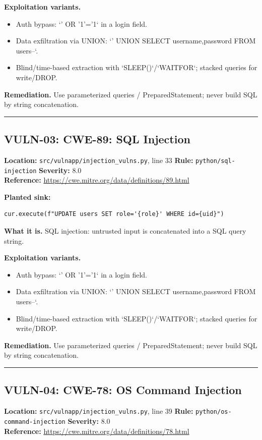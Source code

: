 \documentclass[11pt,a4paper]{article}
\begin{document}
\noindent\textbf{Exploitation variants.}
\begin{itemize}[leftmargin=1.4em,itemsep=1pt,topsep=2pt]
\item Auth bypass: `' OR '1'='1` in a login field.
\item Data exfiltration via UNION: `' UNION SELECT username,password FROM users--`.
\item Blind/time-based extraction with `SLEEP()`/`WAITFOR`; stacked queries for write/DROP.
\end{itemize}
\noindent\textbf{Remediation.} Use parameterized queries / PreparedStatement; never build SQL by string concatenation.

\vspace{4pt}\hrule\vspace{6pt}
\subsection{VULN-03: CWE-89: SQL Injection}
\noindent\textbf{Location:} \texttt{src/vulnapp/injection\_vulns.py}, line 33 \quad \textbf{Rule:} \texttt{python/sql-injection} \quad \textbf{Severity:} 8.0
\\ \textbf{Reference:} \url{https://cwe.mitre.org/data/definitions/89.html}

\noindent\textbf{Planted sink:}
\begin{lstlisting}
cur.execute(f"UPDATE users SET role='{role}' WHERE id={uid}")
\end{lstlisting}
\noindent\textbf{What it is.} SQL injection: untrusted input is concatenated into a SQL query string.

\noindent\textbf{Exploitation variants.}
\begin{itemize}[leftmargin=1.4em,itemsep=1pt,topsep=2pt]
\item Auth bypass: `' OR '1'='1` in a login field.
\item Data exfiltration via UNION: `' UNION SELECT username,password FROM users--`.
\item Blind/time-based extraction with `SLEEP()`/`WAITFOR`; stacked queries for write/DROP.
\end{itemize}
\noindent\textbf{Remediation.} Use parameterized queries / PreparedStatement; never build SQL by string concatenation.

\vspace{4pt}\hrule\vspace{6pt}
\subsection{VULN-04: CWE-78: OS Command Injection}
\noindent\textbf{Location:} \texttt{src/vulnapp/injection\_vulns.py}, line 39 \quad \textbf{Rule:} \texttt{python/os-command-injection} \quad \textbf{Severity:} 8.0
\\ \textbf{Reference:} \url{https://cwe.mitre.org/data/definitions/78.html}
\end{document}

